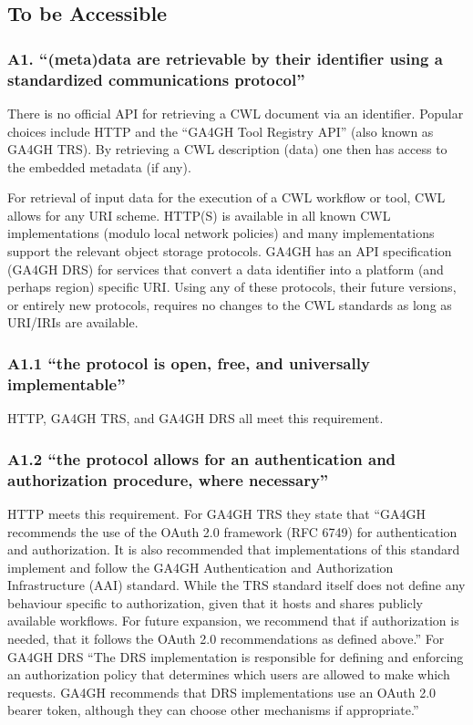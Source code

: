 \subsection{To be Accessible}
\subsubsection{A1. “(meta)data are retrievable by their identifier using a standardized communications protocol”}
There is no official API for retrieving a CWL document via an identifier. Popular choices include HTTP and the “GA4GH Tool Registry API” (also known as GA4GH TRS). By retrieving a CWL description (data) one then has access to the embedded metadata (if any).

For retrieval of input data for the execution of a CWL workflow or tool, CWL allows for any URI scheme. HTTP(S) is available in all known CWL implementations (modulo local network policies) and many implementations support the relevant object storage protocols. GA4GH has an API specification (GA4GH DRS) for services that convert a data identifier into a platform (and perhaps region) specific URI. Using any of these protocols, their future versions, or entirely new protocols, requires no changes to the CWL standards as long as URI/IRIs are available.
\subsubsection{A1.1 “the protocol is open, free, and universally implementable”}
HTTP, GA4GH TRS, and GA4GH DRS all meet this requirement.
\subsubsection{A1.2 “the protocol allows for an authentication and authorization procedure, where necessary”}
HTTP meets this requirement. For GA4GH TRS they state that “GA4GH recommends the use of the OAuth 2.0 framework (RFC 6749) for authentication and authorization. It is also recommended that implementations of this standard implement and follow the GA4GH Authentication and Authorization Infrastructure (AAI) standard.
While the TRS standard itself does not define any behaviour specific to authorization, given that it hosts and shares publicly available workflows. For future expansion, we recommend that if authorization is needed, that it follows the OAuth 2.0 recommendations as defined above.”
For GA4GH DRS “The DRS implementation is responsible for defining and enforcing an authorization policy that determines which users are allowed to make which requests. GA4GH recommends that DRS implementations use an OAuth 2.0 bearer token, although they can choose other mechanisms if appropriate.”

